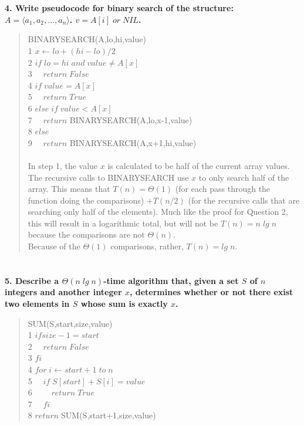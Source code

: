 \documentclass{article}
\begin{document}
\section*{}
\textbf{4. Write pseudocode for binary search of the structure: 
$A = \langle a_1, a_2, ... , a_n \rangle$. $v = A[i]\; or\; NIL$.}

\begin{quote}
\textsf{BINARYSEARCH(A,lo,hi,value)\\
1  $x \leftarrow lo + (hi-lo)/2$\\
2  $if\; lo = hi\; and\; value \not= A[x]$\\
3    $\quad return\; False$\\
4  $if\; value = A[x]$\\
5    $\quad return\; True$\\
6  $else\; if\; value < A[x]$\\
7    $\quad return$ BINARYSEARCH(A,lo,x-1,value)\\
8  $else$\\
9    $\quad return$ BINARYSEARCH(A,x+1,hi,value)\\}
\\
\textsf{In step 1, the value $x$ is calculated to be half of the current array values.
The recursive calls to BINARYSEARCH use $x$ to only search half of the array.
This means that $T(n) = \Theta(1)$ (for each pass through the function doing the comparisons)
$+ T(n/2)$ (for the recursive calls that are searching only half of the elements).
Much like the proof for Question 2, this will result in a logarithmic total, but will not
be $T(n) = n\; lg\; n$ because the comparisons are not $\Theta(n)$.\\
Because of the $\Theta(1)$ comparisons, rather, $T(n) = lg\; n$.}
\end{quote}

\section*{}
\textbf{5. Describe a $\Theta(n\; lg\; n)$-time algorithm that, given a set $S$ of $n$ integers and another integer $x$,
determines whether or not there exist two elements in $S$ whose sum is exactly $x$.}

\begin{quote}
\textsf{SUM(S,start,size,value)\\
1 $if size - 1 = start$\\
2 $\quad return\; False$\\
3 $fi$\\
4 $for\; i \leftarrow start+1\; to\; n$\\
5 $\quad if\; S[start] + S[i] = value$\\
6 $\quad \quad return\; True$\\
7 $\quad fi$\\
8 $return\; $SUM(S,start+1,size,value)\\}
\end{quote}
\end{document}
